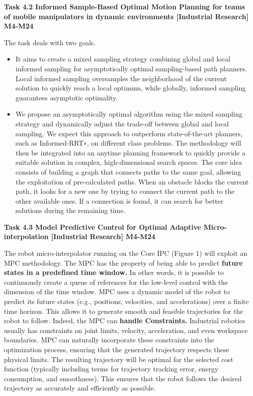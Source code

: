 \begin{longtable}[]
{\begin{minipage}[t]{\linewidth}
\textbf{Task 4.2 Informed Sample-Based Optimal Motion Planning for teams
of mobile manipulators in dynamic environments {[}Industrial Research{]}
M4-M24}

The task deals with two goals.

\begin{itemize}
\item
  It aims to create a mixed sampling strategy combining global and local
  informed sampling for asymptotically optimal sampling-based path
  planners. Local informed sampling oversamples the neighborhood of the
  current solution to quickly reach a local optimum, while globally,
  informed sampling guarantees asymptotic optimality.
\item
  We propose an asymptotically optimal algorithm using the mixed
  sampling strategy and dynamically adjust the trade-off between global
  and local sampling. We expect this approach to outperform
  state-of-the-art planners, such as Informed-RRT∗, on different class
  problems. The methodology will then be integrated into an anytime
  planning framework to quickly provide a suitable solution in complex,
  high-dimensional search spaces. The core idea consists of building a
  graph that connects paths to the same goal, allowing the exploitation
  of pre-calculated paths. When an obstacle blocks the current path, it
  looks for a new one by trying to connect the current path to the other
  available ones. If a connection is found, it can search for better
  solutions during the remaining time.
\end{itemize}

\textbf{Task 4.3 Model Predictive Control for Optimal Adaptive
Micro-interpolation {[}Industrial Research{]} M4-M24}

The robot micro-interpolator running on the Core IPC (Figure 1) will
exploit an MPC methodology. The MPC has the property of being able to
predict \textbf{future states in a predefined time window.} In other
words, it is possible to continuously create a queue of references for
the low-level control with the dimension of the time window. MPC uses a
dynamic model of the robot to predict its future states (e.g.,
positions, velocities, and accelerations) over a finite time horizon.
This allows it to generate smooth and feasible trajectories for the
robot to follow. Indeed, the MPC can \textbf{handle Constraints.}
Industrial robotics usually has constraints on joint limits, velocity,
acceleration, and even workspace boundaries. MPC can naturally
incorporate these constraints into the optimization process, ensuring
that the generated trajectory respects these physical limits. The
resulting trajectory will be optimal for the selected cost function
(typically including terms for trajectory tracking error, energy
consumption, and smoothness). This ensures that the robot follows the
desired trajectory as accurately and efficiently as possible.


\end{minipage}}
\end{longtable}
